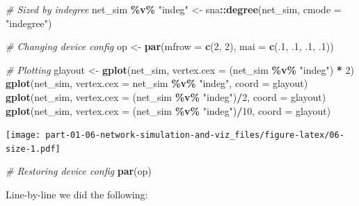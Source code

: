 \documentclass[
]{book}
\newenvironment{Shaded}{\begin{snugshade}}{\end{snugshade}}
\newcommand{\AttributeTok}[1]{\textcolor[rgb]{0.13,0.29,0.53}{#1}}
\newcommand{\CommentTok}[1]{\textcolor[rgb]{0.56,0.35,0.01}{\textit{#1}}}
\newcommand{\DecValTok}[1]{\textcolor[rgb]{0.00,0.00,0.81}{#1}}
\newcommand{\FunctionTok}[1]{\textcolor[rgb]{0.13,0.29,0.53}{\textbf{#1}}}
\newcommand{\NormalTok}[1]{#1}
\newcommand{\OtherTok}[1]{\textcolor[rgb]{0.56,0.35,0.01}{#1}}
\newcommand{\SpecialCharTok}[1]{\textcolor[rgb]{0.81,0.36,0.00}{\textbf{#1}}}
\newcommand{\StringTok}[1]{\textcolor[rgb]{0.31,0.60,0.02}{#1}}
\begin{document}
\begin{Shaded}
\begin{Highlighting}[]
\CommentTok{\# Sized by indegree}
\NormalTok{net\_sim }\SpecialCharTok{\%v\%} \StringTok{"indeg"} \OtherTok{\textless{}{-}}\NormalTok{ sna}\SpecialCharTok{::}\FunctionTok{degree}\NormalTok{(net\_sim, }\AttributeTok{cmode =} \StringTok{"indegree"}\NormalTok{)}

\CommentTok{\# Changing device config}
\NormalTok{op }\OtherTok{\textless{}{-}} \FunctionTok{par}\NormalTok{(}\AttributeTok{mfrow =} \FunctionTok{c}\NormalTok{(}\DecValTok{2}\NormalTok{, }\DecValTok{2}\NormalTok{), }\AttributeTok{mai =} \FunctionTok{c}\NormalTok{(.}\DecValTok{1}\NormalTok{, .}\DecValTok{1}\NormalTok{, .}\DecValTok{1}\NormalTok{, .}\DecValTok{1}\NormalTok{))}

\CommentTok{\# Plotting}
\NormalTok{glayout }\OtherTok{\textless{}{-}} \FunctionTok{gplot}\NormalTok{(net\_sim, }\AttributeTok{vertex.cex =}\NormalTok{ (net\_sim }\SpecialCharTok{\%v\%} \StringTok{"indeg"}\NormalTok{) }\SpecialCharTok{*} \DecValTok{2}\NormalTok{)}
\FunctionTok{gplot}\NormalTok{(net\_sim, }\AttributeTok{vertex.cex =}\NormalTok{ net\_sim }\SpecialCharTok{\%v\%} \StringTok{"indeg"}\NormalTok{, }\AttributeTok{coord =}\NormalTok{ glayout)}
\FunctionTok{gplot}\NormalTok{(net\_sim, }\AttributeTok{vertex.cex =}\NormalTok{ (net\_sim }\SpecialCharTok{\%v\%} \StringTok{"indeg"}\NormalTok{)}\SpecialCharTok{/}\DecValTok{2}\NormalTok{, }\AttributeTok{coord =}\NormalTok{ glayout)}
\FunctionTok{gplot}\NormalTok{(net\_sim, }\AttributeTok{vertex.cex =}\NormalTok{ (net\_sim }\SpecialCharTok{\%v\%} \StringTok{"indeg"}\NormalTok{)}\SpecialCharTok{/}\DecValTok{10}\NormalTok{, }\AttributeTok{coord =}\NormalTok{ glayout)}
\end{Highlighting}
\end{Shaded}

\texttt{[image: part-01-06-network-simulation-and-viz\_files/figure-latex/06-size-1.pdf]}

\begin{Shaded}
\begin{Highlighting}[]
\CommentTok{\# Restoring device config}
\FunctionTok{par}\NormalTok{(op)}
\end{Highlighting}
\end{Shaded}

Line-by-line we did the following:
\end{document}
